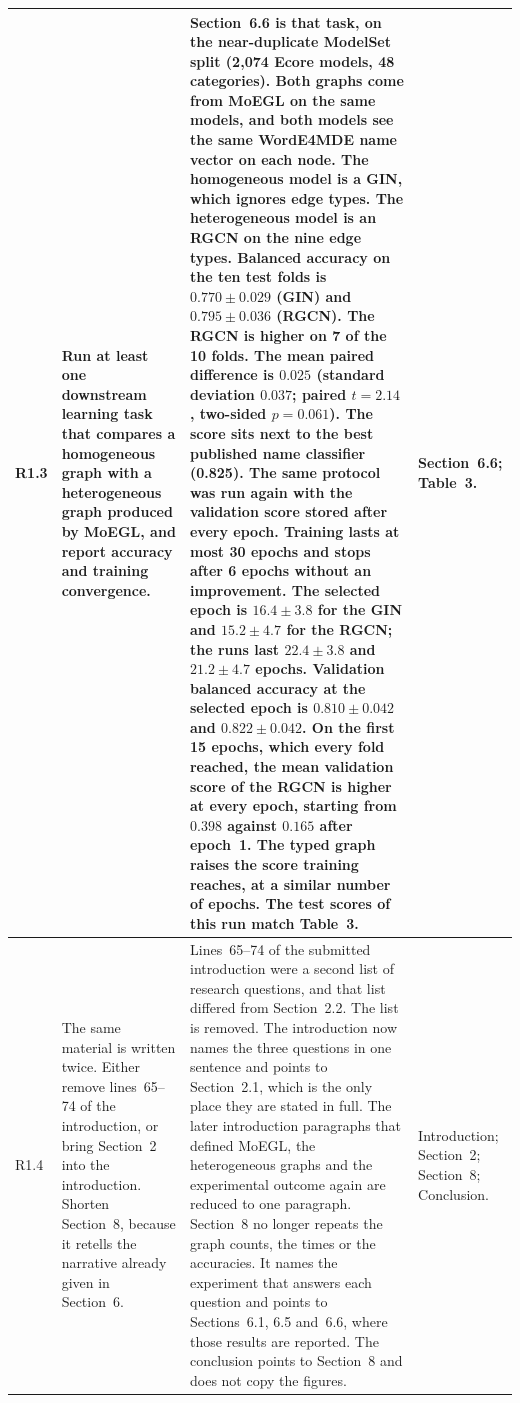 \documentclass[11pt,a4paper]{article}
\begin{document}
\begin{longtable}{@{}P{1.0cm}P{4.3cm}P{5.9cm}P{3.9cm}@{}}
R1.3 &
Run at least one downstream learning task that compares a homogeneous graph with a heterogeneous graph produced by MoEGL, and report accuracy and training convergence. &
Section~6.6 is that task, on the near-duplicate ModelSet split (2{,}074 Ecore models, 48 categories). Both graphs come from MoEGL on the same models, and both models see the same WordE4MDE name vector on each node. The homogeneous model is a GIN, which ignores edge types. The heterogeneous model is an RGCN on the nine edge types. Balanced accuracy on the ten test folds is $0.770\pm0.029$ (GIN) and $0.795\pm0.036$ (RGCN). The RGCN is higher on 7 of the 10 folds. The mean paired difference is $0.025$ (standard deviation $0.037$; paired $t=2.14$, two-sided $p=0.061$). The score sits next to the best published name classifier (0.825).
The same protocol was run again with the validation score stored after every epoch. Training lasts at most 30 epochs and stops after 6 epochs without an improvement. The selected epoch is $16.4\pm3.8$ for the GIN and $15.2\pm4.7$ for the RGCN; the runs last $22.4\pm3.8$ and $21.2\pm4.7$ epochs. Validation balanced accuracy at the selected epoch is $0.810\pm0.042$ and $0.822\pm0.042$. On the first 15 epochs, which every fold reached, the mean validation score of the RGCN is higher at every epoch, starting from $0.398$ against $0.165$ after epoch~1. The typed graph raises the score training reaches, at a similar number of epochs. The test scores of this run match Table~3. &
Section~6.6; Table~3. \\
\midrule

R1.4 &
The same material is written twice. Either remove lines~65--74 of the introduction, or bring Section~2 into the introduction. Shorten Section~8, because it retells the narrative already given in Section~6. &
Lines~65--74 of the submitted introduction were a second list of research questions, and that list differed from Section~2.2. The list is removed. The introduction now names the three questions in one sentence and points to Section~2.1, which is the only place they are stated in full. The later introduction paragraphs that defined MoEGL, the heterogeneous graphs and the experimental outcome again are reduced to one paragraph.
Section~8 no longer repeats the graph counts, the times or the accuracies. It names the experiment that answers each question and points to Sections~6.1, 6.5 and~6.6, where those results are reported. The conclusion points to Section~8 and does not copy the figures. &
Introduction; Section~2; Section~8; Conclusion. \\
\midrule


\end{longtable}
\end{document}

